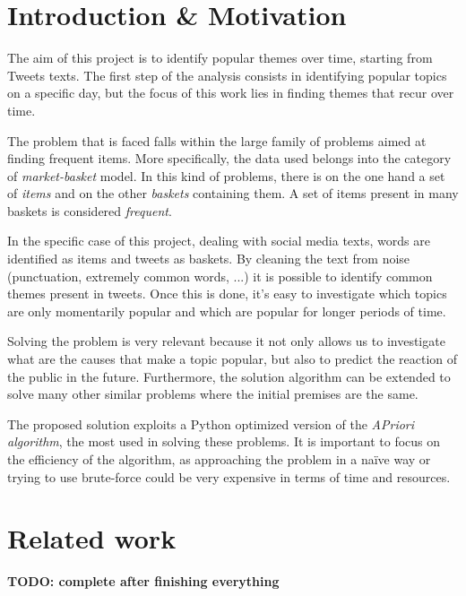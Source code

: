 
\section{Introduction \& Motivation}

The aim of this project is to identify popular themes over time, starting from Tweets texts. The first step of the analysis consists in identifying popular topics on a specific day, but the focus of this work lies in finding themes that recur over time.

The problem that is faced falls within the large family of problems aimed at finding frequent items. More specifically, the data used belongs into the category of \textit{market-basket} model. In this kind of problems, there is on the one hand a set of \textit{items} and on the other \textit{baskets} containing them. A set of items present in many baskets is considered \textit{frequent}.

In the specific case of this project, dealing with social media texts, words are identified as items and tweets as baskets. By cleaning the text from noise (punctuation, extremely common words, ...) it is possible to identify common themes present in tweets. Once this is done, it's easy to investigate which topics are only momentarily popular and which are popular for longer periods of time.

Solving the problem is very relevant because it not only allows us to investigate what are the causes that make a topic popular, but also to predict the reaction of the public in the future. Furthermore, the solution algorithm can be extended to solve many other similar problems where the initial premises are the same.

The proposed solution exploits a Python optimized version of the \textit{APriori algorithm}, the most used in solving these problems. It is important to focus on the efficiency of the algorithm, as approaching the problem in a naïve way or trying to use brute-force could be very expensive in terms of time and resources.



\section{Related work}

\begin{center}
  \textbf{TODO: complete after finishing everything}
\end{center}


